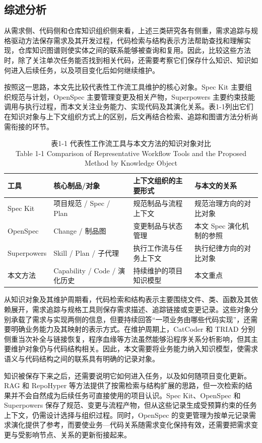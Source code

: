 \subsection{综述分析}
从需求侧、代码侧和仓库知识组织侧来看，上述三类研究各有侧重，需求追踪与规格驱动方法保存需求及其开发过程，代码检索与结构表示方法帮助查找和理解实现，仓库知识图谱则使实体之间的联系能够被查询和复用。因此，比较这些方法时，除了关注单次任务能否找到相关代码，还需要考察它们保存什么知识、知识如何进入后续任务，以及项目变化后如何继续维护。

按照这一思路，本文先比较代表性工作流工具维护的核心对象。Spec Kit 主要组织规范与计划，OpenSpec 主要管理变更及相关产物，Superpowers 主要约束技能调用与执行过程，而本文关注业务能力、实现代码及其演化关系。表1-1列出它们在知识对象与上下文组织方式上的区别，后文再结合检索、追踪和图谱方法分析尚需衔接的环节。

\begin{table}[htbp]
\centering
\small
\caption{表1-1 代表性工作流工具与本文方法的知识对象对比\\Table 1-1 Comparison of Representative Workflow Tools and the Proposed Method by Knowledge Object}
\begin{tabularx}{\textwidth}{|X|X|X|X|}
\hline
\textbf{工具} & \textbf{核心制品/对象} & \textbf{上下文组织的主要形式} & \textbf{与本文的关系} \\
\hline
Spec Kit & 项目规范 / Spec / Plan & 规范制品与流程上下文 & 规范治理方向的对比对象 \\
OpenSpec & Change / 制品图 & 变更制品与状态管理 & 本文 Spec 演化机制的参照 \\
Superpowers & Skill / Plan / 子代理 & 执行工作流与任务上下文 & 执行纪律方向的对比对象 \\
本文方法 & Capability / Code / 演化历史 & 持续维护的项目知识模型 & 本文重点 \\
\hline
\end{tabularx}
\end{table}

从知识对象及其维护周期看，代码检索和结构表示主要围绕文件、类、函数及其依赖展开，需求追踪与规格工具则保存需求描述、追踪链接或变更记录。这些对象分别承载了需求与实现两侧的信息，但要持续回答“一项业务由哪些代码实现”，还需要明确业务能力及其映射的表示方式。在维护周期上，CatCoder 和 TRIAD 分别侧重当次补全与链接恢复，程序血缘等方法虽然能够沿程序关系分析影响，但其主要维护对象仍与代码结构相关。因此，本文需要将业务能力纳入知识模型，使需求语义与代码结构之间的联系具有明确的记录对象。

知识被保存下来之后，还需要说明它如何进入任务，以及如何随项目变化更新。RAG 和 RepoHyper 等方法提供了按需检索与结构扩展的思路，但一次检索的结果并不会自然成为后续任务可直接使用的项目认识。Spec Kit、OpenSpec 和 Superpowers 保存了规范、变更与流程产物，但从这些记录生成受预算约束的任务上下文，仍需设计选择与组织过程。同时，OpenSpec 的变更管理为按单元记录需求演化提供了参考，而要使业务—代码关系随需求变化保持有效，还需要把需求变更与受影响节点、关系的更新衔接起来。

